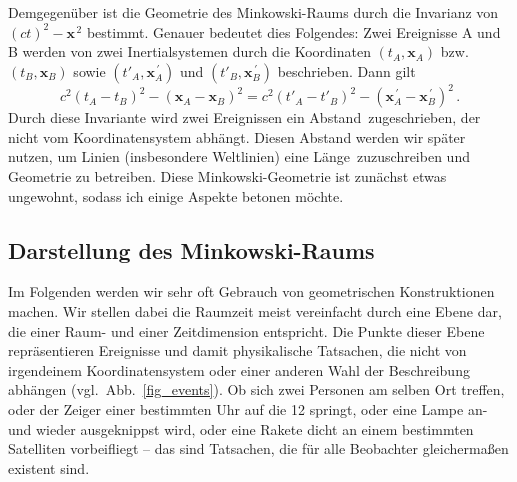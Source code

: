 Demgegen\"uber ist die Geometrie des Minkowski-Raums 
durch die Invarianz von $(ct)^2 - \pmb{x}^{\,2}$ bestimmt.
Genauer bedeutet dies Folgendes: Zwei Ereignisse A
und B werden von zwei Inertial\-sys\-temen durch die
Koordinaten $(t_A,\pmb{x}_A)$ bzw.\ $(t_B,\pmb{x}_B)$
sowie $(t'_A,\pmb{x}^{\,\prime}_A)$ und $(t'_B,\pmb{x}^{\,\prime}_B)$
beschrieben. Dann gilt
\begin{equation}
       c^2(t_A-t_B)^2 - (\pmb{x}_A - \pmb{x}_B)^2 =
       c^2(t'_A-t'_B)^2 - (\pmb{x}^{\,\prime}_A - \pmb{x}^{\,\prime}_B)^2 \, . 
\end{equation}
Durch diese Invariante wird zwei Ereignissen ein
\glqq Abstand\grqq\ zugeschrieben, der nicht vom
Koordinatensystem abh\"angt. Diesen Abstand werden
wir sp\"ater nutzen, um Linien (insbesondere 
Weltlinien) eine \glqq L\"ange\grqq\ zuzuschreiben
und Geometrie zu betreiben.
Diese Minkowski-Geometrie ist zun\"achst etwas
ungewohnt, sodass ich einige Aspekte betonen m\"ochte.

\subsection{Darstellung des Minkowski-Raums}

Im Folgenden werden wir sehr oft Gebrauch von
geometrischen Konstruktionen machen. Wir stellen
dabei die Raumzeit meist vereinfacht durch eine
Ebene dar, die einer
Raum- und einer Zeitdimension entspricht.
Die Punkte dieser Ebene repr\"asentieren 
Ereignisse und damit physikalische Tatsachen,
die nicht von irgendeinem Koordinatensystem oder 
einer anderen Wahl der Beschreibung 
abh\"angen (vgl.\ Abb.\ \ref{fig_events}). 
Ob sich zwei Personen am selben Ort treffen, oder
der Zeiger einer bestimmten Uhr auf die 12 springt,
oder eine Lampe an- und wieder ausgeknippst
wird, oder eine Rakete dicht an einem bestimmten
Satelliten vorbeifliegt -- das sind Tatsachen, die 
f\"ur alle Beobachter gleicherma\ss en existent 
sind. 


